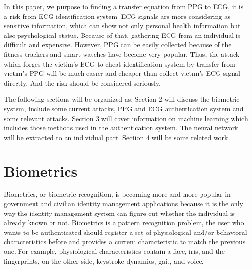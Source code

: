\documentclass[a4paper,12pt]{article}
\begin{document}
In this paper, we purpose to finding a transfer equation from PPG to ECG, it is a risk from ECG identification system. ECG signals are more considering as sensitive information, which can show not only personal health information but also psychological status\parencite{Damousis:2008unobtrusive}. Because of that, gathering ECG from an individual is difficult and expensive. However, PPG can be easily collected because of the fitness trackers and smart-watches have become very popular\parencite{Blasco:2018feasibility}. Thus, the attack which forges the victim's ECG to cheat identification system by transfer from victim's PPG will be much easier and cheaper than collect victim's ECG signal directly. And the risk should be considered seriously. 

The following sections will be organized as: Section 2 will discuss the biometric system, include some current attacks, PPG and ECG authentication system and some relevant attacks. Section 3 will cover information on machine learning which includes those methods used in the authentication system. The neural network will be extracted to an individual part. Section 4 will be some related work.

\section{Biometrics}\label{Biometrics}
Biometrics, or biometric recognition, is becoming more and more popular in government and civilian identity management applications because it is the only way the identity management system can figure out whether the individual is already known or not\parencite{Jain:2011bio}. Biometrics is a pattern recognition problem, the user who wants to be authenticated should register a set of physiological and/or behavioral characteristics before and provides a current characteristic to match the previous one\parencite{Blasco:2018feasibility}. For example, physiological characteristics contain a face, iris, and the fingerprints, on the other side, keystroke dynamics, gait, and voice\parencite{Agrafioti:2011heart}. 
\end{document}
